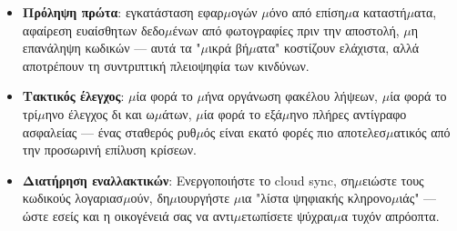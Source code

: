 \begin{itemize}
  \item \textbf{Πρόληψη πρώτα}: εγκατάσταση εφαρ$\mu$ογών $\mu$όνο από επίση$\mu$α καταστή$\mu$ατα, αφαίρεση ευαίσθητων δεδο$\mu$ένων από φωτογραφίες πριν την αποστολή, $\mu$η επανάληψη κωδικών — αυτά τα "$\mu$ικρά βή$\mu$ατα" κοστίζουν ελάχιστα, αλλά αποτρέπουν τη συντριπτική πλειοψηφία των κινδύνων.
  \item \textbf{Τακτικός έλεγχος}: $\mu$ία φορά το $\mu$ήνα οργάνωση φακέλου λήψεων, $\mu$ία φορά το τρί$\mu$ηνο έλεγχος δι και ω$\mu$άτων, $\mu$ία φορά το εξά$\mu$ηνο πλήρες αντίγραφο ασφαλείας — ένας σταθερός ρυθ$\mu$ός είναι εκατό φορές πιο αποτελεσ$\mu$ατικός από την προσωρινή επίλυση κρίσεων.
  \item \textbf{Διατήρηση εναλλακτικών}: Ενεργοποιήστε το cloud sync, ση$\mu$ειώστε τους κωδικούς λογαριασ$\mu$ούν, δη$\mu$ιουργήστε $\mu$ια "λίστα ψηφιακής κληρονο$\mu$ιάς" — ώστε εσείς και η οικογένειά σας να αντι$\mu$ετωπίσετε ψύχραι$\mu$α τυχόν απρόοπτα.
\end{itemize}
